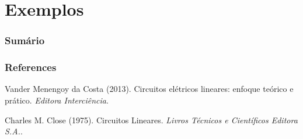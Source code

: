 \documentclass[mathserif,usenames,dvipsnames]{beamer}
\begin{document}
\section{Exemplos}
\begin{frame}
\frametitle{Sumário}
\small
\tableofcontents[currentsection]
\end{frame}

\begin{frame}
\frametitle{References}
\footnotesize{
	\begin{thebibliography}{99} %
		 Vander Menengoy da Costa (2013).
		\newblock Circuitos elétricos lineares: enfoque teórico e prático.
		\newblock \emph{Editora Interciência}.
		
		 Charles M. Close (1975).
		\newblock Circuitos Lineares.
		\newblock \emph{Livros Técnicos e Científicos Editora S.A.}.
	\end{thebibliography}
}
\end{frame}
\end{document}
